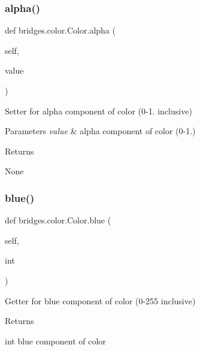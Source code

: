 \subsubsection{\texorpdfstring{alpha()}{alpha()}\hspace{0.1cm}{\footnotesize\ttfamily [2/2]}}
{\footnotesize\ttfamily def bridges.\+color.\+Color.\+alpha (\begin{DoxyParamCaption}\item[{}]{self,  }\item[{}]{value }\end{DoxyParamCaption})}



Setter for alpha component of color (0-\/1. inclusive) 


\begin{DoxyParams}{Parameters}
{\em value} & alpha component of color (0-\/1.) \\
\hline
\end{DoxyParams}
\begin{DoxyReturn}{Returns}


None 
\end{DoxyReturn}
\mbox{\label{classbridges_1_1color_1_1_color_a14f94eb29dcabf578a1932c5477e12f3}} 
\subsubsection{\texorpdfstring{blue()}{blue()}\hspace{0.1cm}{\footnotesize\ttfamily [1/2]}}
{\footnotesize\ttfamily def bridges.\+color.\+Color.\+blue (\begin{DoxyParamCaption}\item[{}]{self,  }\item[{}]{int }\end{DoxyParamCaption})}



Getter for blue component of color (0-\/255 inclusive) 

\begin{DoxyReturn}{Returns}


int blue component of color 
\end{DoxyReturn}
\mbox{\label{classbridges_1_1color_1_1_color_a0673063270c8a522b086a916f09dd1f5}} 
